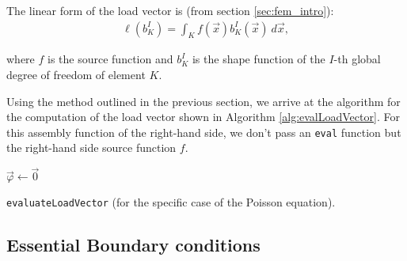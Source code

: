 The linear form of the load vector is (from section \ref{sec:fem_intro}):
\begin{align}
    \ell(b^I_K) = \int_K f(\vec{x}) b^I_K(\vec{x}) \ d\vec{x},
\end{align}

where $f$ is the source function and $b^I_K$ is the shape function of the $I$-th global degree of freedom of element $K$.

Using the method outlined in the previous section, we arrive at the algorithm for the computation of the
load vector shown in Algorithm \ref{alg:evalLoadVector}.
For this assembly function of the right-hand side, we don't pass an \texttt{eval} function
but the right-hand side source function $f$.

\begin{algorithm}[h]
    \vspace{0.5cm}
    \small
    \linespread{1.35}\selectfont

    $\vec{\varphi} \gets \vec{0}$ {\color{darkgray}}

    \KwRet{$\vec{\varphi}$}
    \vspace{0.5cm}
    \caption{\texttt{evaluateLoadVector} (for the specific case of the Poisson equation).}
    \label{alg:evalLoadVector}
\end{algorithm}

\subsection{Essential Boundary conditions}

